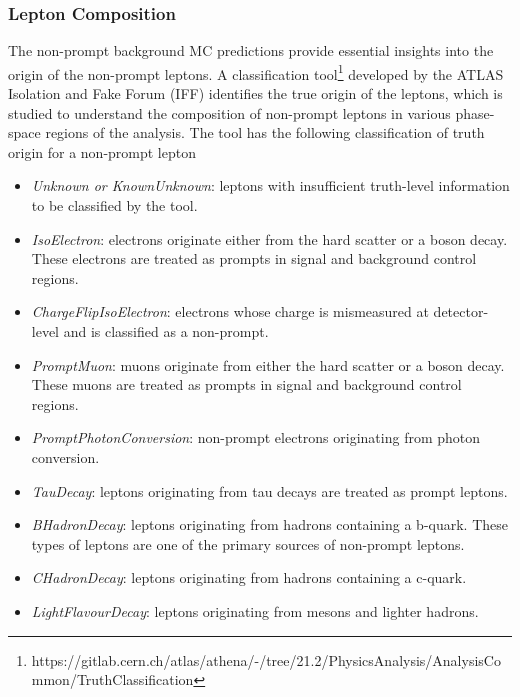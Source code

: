\subsubsection{Lepton Composition}
\label{subsubsec:LepComp}
The non-prompt background MC predictions provide essential insights into the origin of the non-prompt leptons. A classification tool\footnote{https://gitlab.cern.ch/atlas/athena/-/tree/21.2/PhysicsAnalysis/AnalysisCommon/TruthClassification} developed by the ATLAS Isolation and Fake Forum (IFF) identifies the true origin of the leptons, which is studied to understand the composition of non-prompt leptons in various phase-space regions of the analysis. The tool has the following classification of truth origin for a non-prompt lepton

\begin{itemize}
    \item{ \textit{Unknown or KnownUnknown}: leptons with insufficient truth-level information to be classified by the tool.}
 
    \item { \textit{IsoElectron}: electrons originate either from the hard scatter or a boson decay. These electrons are treated as prompts in signal and background control regions.}
    
    \item{ \textit{ChargeFlipIsoElectron}: electrons whose charge is mismeasured at detector-level and is classified as a non-prompt.}
    
    \item{ \textit{PromptMuon}: muons originate from either the hard scatter or a boson decay. These muons are treated as prompts in signal and background control regions.}
    
    \item{\textit{PromptPhotonConversion}: non-prompt electrons originating from photon conversion. }
    
    \item{\textit{TauDecay}: leptons originating from tau decays are treated as prompt leptons.}
    
    \item{\textit{BHadronDecay}: leptons originating from hadrons containing a b-quark. These types of leptons are one of the primary sources of non-prompt leptons.}
    
    \item{\textit{CHadronDecay}: leptons originating from hadrons containing a c-quark.}
    
    \item{\textit{LightFlavourDecay}: leptons originating from mesons and lighter hadrons.}

\end{itemize}


